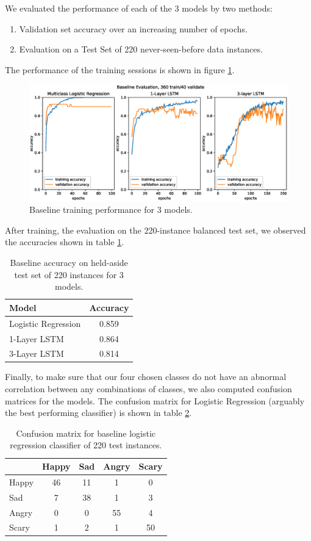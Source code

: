 \documentclass{article}
\begin{document}
We evaluated the performance of each of the 3 models by two methods:
\begin{enumerate}
\item Validation set accuracy over an increasing number of epochs.
\item Evaluation on a Test Set of 220 never-seen-before data instances.
\end{enumerate}

The performance of the training sessions is shown in figure \ref{fig:baseline_train}.
\begin{figure}[]
	\centering
	\includegraphics[width=1.25\textwidth]{Baseline400.eps}  
	\caption{Baseline training performance for 3 models.}
	\label{fig:baseline_train}
\end{figure}

After training, the evaluation on  the 220-instance balanced test set, we observed the accuracies shown in table \ref{tbl:baseline_acc}.
\begin{table}[] 
\caption{Baseline accuracy on held-aside test set of 220 instances for 3 models.}
\label{tbl:baseline_acc}
\centering
\begin{tabular}{lc} 
\toprule
\hline
Model & Accuracy \\ 
\midrule
Logistic Regression & 0.859 \\
1-Layer LSTM & 0.864 \\ 
3-Layer LSTM & 0.814 \\ 
\bottomrule
\end{tabular}
\end{table}

Finally, to make sure that our four chosen classes do not have an abnormal correlation between any combinations of classes, we also computed confusion matrices for the models. The confusion matrix for Logistic Regression (arguably the best performing classifier) is shown in table \ref{tbl:baseline_conf}.

\begin{table}[] 
\caption{Confusion matrix for baseline logistic regression classifier of 220 test instances.}
\label{tbl:baseline_conf}
\centering
\begin{tabular}{lcccc} 
\toprule
\hline
 & Happy & Sad & Angry & Scary \\ 
\midrule
Happy & 46 & 11 & 1 & 0 \\
Sad   &  7 & 38 & 1 & 3 \\
Angry &  0 &  0 & 55 & 4 \\
Scary &  1 &  2 & 1 &  50 \\
\bottomrule
\end{tabular}
\end{table}
\end{document}
